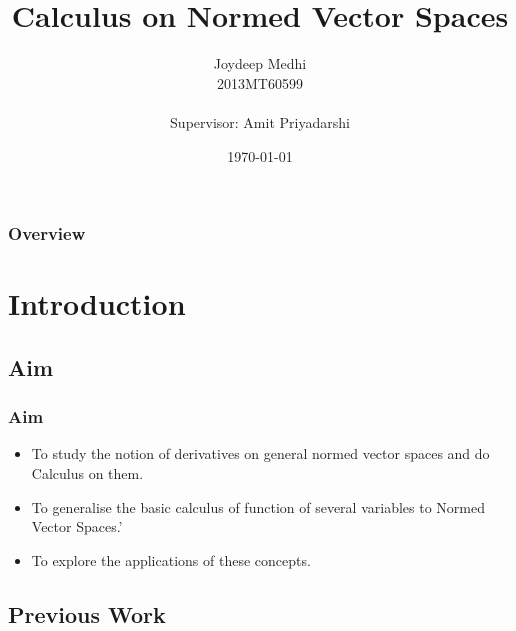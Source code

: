 \documentclass{beamer}
\title[Calculus on Norm]{Calculus on Normed Vector Spaces} %
\author[Joydeep]{Joydeep Medhi\\{\scriptsize 2013MT60599 \\~\\ \scriptsize Supervisor: Amit Priyadarshi}} %
\institute[IIT Delhi] %
{
Dept. of Mathematics \\
Indian Institute of Technology\\ %
\medskip
\textit{} %
Midterm Presentation 2
}
\date{\today} %
\begin{document}
\begin{frame}
\titlepage %
\end{frame}

\begin{frame}
\frametitle{Overview} %
\tableofcontents %
\end{frame}

\section{Introduction} %

\subsection{Aim} %

\begin{frame}
\frametitle{Aim}
\begin{itemize}
\item To study the notion of derivatives on general normed vector spaces and do Calculus on them.
\item To generalise the basic calculus of function of several variables to Normed Vector Spaces.'
\item To explore the applications of these concepts.
\end{itemize}
\end{frame}

\subsection{Previous Work}
\end{document}
